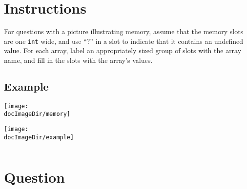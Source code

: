 


\def \memoryImage{%
  \par\medskip\texttt{[image: \\docImageDir/memory]}%
}

\def \code #1{{
  \inputminted{cpp}{\docCodeDir/.#1.cpp.gen.section.array}
}}



\docCopyright

\section*{Instructions}

For questions with a picture illustrating memory, assume that the memory slots
are one \texttt{int} wide, and use ``?'' in a slot to indicate that it
contains an undefined value.  For each array, label an appropriately sized
group of slots with the array name, and fill in the slots with the array's
values.

\subsection*{Example}
\vspace{-2ex}
\begin{minipage}[t]{0.5\linewidth} \vspace{0ex}
  \vspace{-2.7ex}
  \memoryImage
  \par
  \vspace{-0.63in}
  \hspace{0.45in}
  \texttt{[image: \\docImageDir/example]}
\end{minipage}
\begin{minipage}[t]{0.5\linewidth} \vspace{0ex}
  \code{example}
\end{minipage}

\section{Question}

